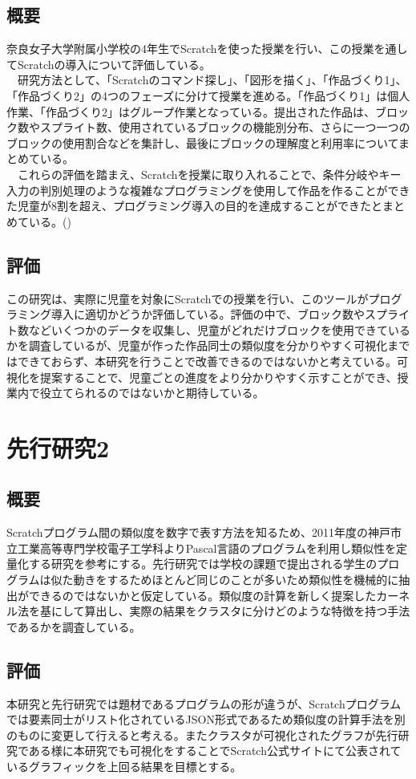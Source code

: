 \documentclass[a4paper,10pt,onecolumn,oneside,openany]{jsbook}
\begin{document}
\subsection{概要}
奈良女子大学附属小学校の4年生でScratchを使った授業を行い、この授業を通してScratchの導入について評価している。
\\
　研究方法として、「Scratchのコマンド探し」、「図形を描く」、「作品づくり1」、「作品づくり2」の4つのフェーズに分けて授業を進める。「作品づくり1」は個人作業、「作品づくり2」はグループ作業となっている。提出された作品は、ブロック数やスプライト数、使用されているブロックの機能別分布、さらに一つ一つのブロックの使用割合などを集計し、最後にブロックの理解度と利用率についてまとめている。
\\
　これらの評価を踏まえ、Scratchを授業に取り入れることで、条件分岐やキー入力の判別処理のような複雑なプログラミングを使用して作品を作ることができた児童が8割を超え、プログラミング導入の目的を達成することができたとまとめている。(\cite{preEssay1})

\subsection{評価}
この研究は、実際に児童を対象にScratchでの授業を行い、このツールがプログラミング導入に適切かどうか評価している。評価の中で、ブロック数やスプライト数などいくつかのデータを収集し、児童がどれだけブロックを使用できているかを調査しているが、児童が作った作品同士の類似度を分かりやすく可視化まではできておらず、本研究を行うことで改善できるのではないかと考えている。可視化を提案することで、児童ごとの進度をより分かりやすく示すことができ、授業内で役立てられるのではないかと期待している。
\section{先行研究2}
\subsection{概要}
Scratchプログラム間の類似度を数字で表す方法を知るため、2011年度の神戸市立工業高等専門学校電子工学科よりPascal言語のプログラムを利用し類似性を定量化する研究を参考にする。先行研究では学校の課題で提出される学生のプログラムは似た動きをするためほとんど同じのことが多いため類似性を機械的に抽出ができるのではないかと仮定している。類似度の計算を新しく提案したカーネル法を基にして算出し、実際の結果をクラスタに分けどのような特徴を持つ手法であるかを調査している。\cite{preEssay2}
\subsection{評価}
本研究と先行研究では題材であるプログラムの形が違うが、Scratchプログラムでは要素同士がリスト化されているJSON形式であるため類似度の計算手法を別のものに変更して行えると考える。またクラスタが可視化されたグラフが先行研究である様に本研究でも可視化をすることでScratch公式サイトにて公表されているグラフィックを上回る結果を目標とする。
\end{document}
